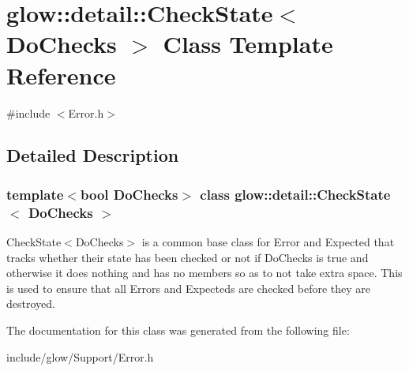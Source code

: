 \hypertarget{classglow_1_1detail_1_1_check_state}{}\section{glow\+:\+:detail\+:\+:Check\+State$<$ Do\+Checks $>$ Class Template Reference}
\label{classglow_1_1detail_1_1_check_state}


{\ttfamily \#include $<$Error.\+h$>$}



\subsection{Detailed Description}
\subsubsection*{template$<$bool Do\+Checks$>$\newline
class glow\+::detail\+::\+Check\+State$<$ Do\+Checks $>$}

Check\+State$<$\+Do\+Checks$>$ is a common base class for Error and Expected that tracks whether their state has been checked or not if Do\+Checks is true and otherwise it does nothing and has no members so as to not take extra space. This is used to ensure that all Errors and Expecteds are checked before they are destroyed. 

The documentation for this class was generated from the following file\+:\begin{DoxyCompactItemize}
\item 
include/glow/\+Support/Error.\+h\end{DoxyCompactItemize}
